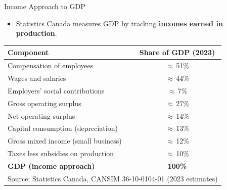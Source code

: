 \documentclass[aspectratio=169]{beamer}
\begin{document}
\begin{frame}{Income Approach to GDP}
\transfade
\begin{itemize}[<+->]
  \item Statistics Canada measures GDP by tracking \textbf{incomes earned in production}.
\end{itemize}
\vspace{0.3em}
\begin{center}
\renewcommand{\arraystretch}{1.35}
\small
\begin{tabular}{lc}
\toprule
\textbf{Component} & \textbf{Share of GDP (2023)} \\
\midrule
Compensation of employees & $\approx$\,51\% \\
\quad Wages and salaries & $\approx$\,44\% \\
\quad Employers' social contributions & $\approx$\,7\% \\
Gross operating surplus & $\approx$\,27\% \\
\quad Net operating surplus & $\approx$\,14\% \\
\quad Capital consumption (depreciation) & $\approx$\,13\% \\
Gross mixed income (small business) & $\approx$\,12\% \\
Taxes less subsidies on production & $\approx$\,10\% \\
\midrule
\textbf{GDP (income approach)} & \textbf{100\%} \\
\bottomrule
\multicolumn{2}{l}{\scriptsize Source: Statistics Canada, CANSIM 36-10-0104-01 (2023 estimates)}
\end{tabular}
\end{center}
\end{frame}
\end{document}
